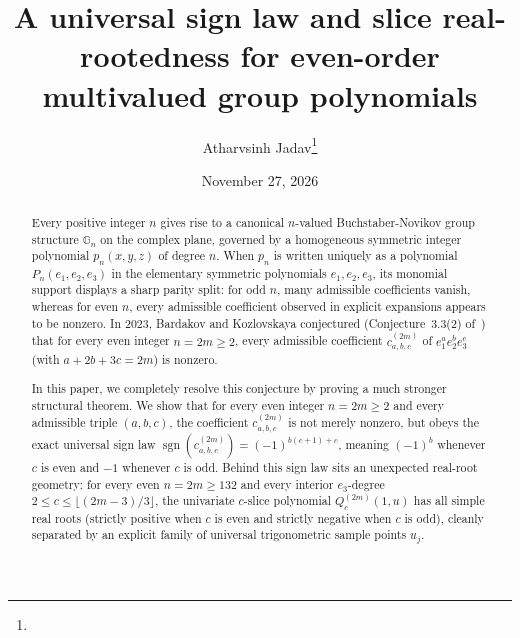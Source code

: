 \documentclass[10pt]{article}
\title{\Large A universal sign law and slice real-rootedness for even-order multivalued group polynomials}
\author{Atharvsinh Jadav\thanks{\code{jadavatharv2010@gmail.com}}}
\affil{Independent Researcher, \url{https://athrix.me/}}
\date{\normalsize November 27, 2026}
\numberwithin{equation}{section}
\theoremstyle{plain}
\theoremstyle{definition}
\newcommand{\G}{\mathbb{G}}
\newcommand{\1}{\mathbf{1}}
\DeclareMathOperator{\sgn}{sgn}
\begin{document}
\flushbottom
\makeatletter{}\makeatother
\setlength{\skip\footins}{8pt plus 1pt minus 1pt}
\maketitle
\setlength{\abovedisplayskip}{9.5pt plus 3pt minus 4pt}
\setlength{\belowdisplayskip}{9.5pt plus 3pt minus 4pt}

\begin{abstract}
Every positive integer $n$ gives rise to a canonical $n$-valued Buchstaber-Novikov group structure $\G_n$ on the complex plane, governed by a homogeneous symmetric integer polynomial $p_n(x, y, z)$ of degree $n$. When $p_n$ is written uniquely as a polynomial $P_n(e_1, e_2, e_3)$ in the elementary symmetric polynomials $e_1, e_2, e_3$, its monomial support displays a sharp parity split: for odd $n$, many admissible coefficients vanish, whereas for even $n$, every admissible coefficient observed in explicit expansions appears to be nonzero. In 2023, Bardakov and Kozlovskaya conjectured (Conjecture~3.3(2) of~\cite{BK2023}) that for every even integer $n = 2m \ge 2$, every admissible coefficient $c_{a,b,c}^{(2m)}$ of $e_1^a e_2^b e_3^c$ (with $a + 2b + 3c = 2m$) is nonzero.

In this paper, we completely resolve this conjecture by proving a much stronger structural theorem. We show that for every even integer $n = 2m \ge 2$ and every admissible triple $(a, b, c)$, the coefficient $c_{a,b,c}^{(2m)}$ is not merely nonzero, but obeys the exact universal sign law $\sgn(c_{a,b,c}^{(2m)}) = (-1)^{b(c+1)+c}$, meaning $(-1)^b$ whenever $c$ is even and $-1$ whenever $c$ is odd. Behind this sign law sits an unexpected real-root geometry: for every even $n = 2m \ge 132$ and every interior $e_3$-degree $2 \le c \le \lfloor (2m-3)/3 \rfloor$, the univariate $c$-slice polynomial $Q_c^{(2m)}(1, u)$ has all simple real roots (strictly positive when $c$ is even and strictly negative when $c$ is odd), cleanly separated by an explicit family of universal trigonometric sample points $u_j$.


\end{abstract}
\end{document}
